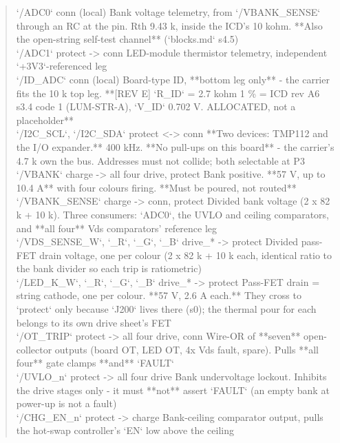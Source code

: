 \documentclass[11pt,a4paper]{article}
\begin{document}
\begin{quote}
\textbar{} `/ADC0` \textbar{} conn (local) \textbar{} Bank voltage telemetry, from `/VBANK\_SENSE` through an RC at the pin. Rth 9.43 k, inside the ICD's 10 kohm. {*}{*}Also the open-string self-test channel{*}{*} (`blocks.md` s4.5) \textbar{}\\
\textbar{} `/ADC1` \textbar{} protect -\textgreater{} conn \textbar{} LED-module thermistor telemetry, independent `+3V3`-referenced leg \textbar{}\\
\textbar{} `/ID\_ADC` \textbar{} conn (local) \textbar{} Board-type ID, {*}{*}bottom leg only{*}{*} - the carrier fits the 10 k top leg. {*}{*}{[}REV E{]} `R\_ID` = 2.7 kohm 1 \% = ICD rev A6 s3.4 code 1 (LUM-STR-A), `V\_ID` 0.702 V. ALLOCATED, not a placeholder{*}{*} \textbar{}\\
\textbar{} `/I2C\_SCL`, `/I2C\_SDA` \textbar{} protect \textless{}-\textgreater{} conn \textbar{} {*}{*}Two devices: TMP112 and the I/O expander.{*}{*} 400 kHz. {*}{*}No pull-ups on this board{*}{*} - the carrier's 4.7 k own the bus. Addresses must not collide; both selectable at P3 \textbar{}\\
\textbar{} `/VBANK` \textbar{} charge -\textgreater{} all four drive, protect \textbar{} Bank positive. {*}{*}57 V, up to 10.4 A{*}{*} with four colours firing. {*}{*}Must be poured, not routed{*}{*} \textbar{}\\
\textbar{} `/VBANK\_SENSE` \textbar{} charge -\textgreater{} conn, protect \textbar{} Divided bank voltage (2 x 82 k + 10 k). Three consumers: `ADC0`, the UVLO and ceiling comparators, and {*}{*}all four{*}{*} Vds comparators' reference leg \textbar{}\\
\textbar{} `/VDS\_SENSE\_W`, `\_R`, `\_G`, `\_B` \textbar{} drive\_{*} -\textgreater{} protect \textbar{} Divided pass-FET drain voltage, one per colour (2 x 82 k + 10 k each, identical ratio to the bank divider so each trip is ratiometric) \textbar{}\\
\textbar{} `/LED\_K\_W`, `\_R`, `\_G`, `\_B` \textbar{} drive\_{*} -\textgreater{} protect \textbar{} Pass-FET drain = string cathode, one per colour. {*}{*}57 V, 2.6 A each.{*}{*} They cross to `protect` only because `J200` lives there (s0); the thermal pour for each belongs to its own drive sheet's FET \textbar{}\\
\textbar{} `/OT\_TRIP` \textbar{} protect -\textgreater{} all four drive, conn \textbar{} Wire-OR of {*}{*}seven{*}{*} open-collector outputs (board OT, LED OT, 4x Vds fault, spare). Pulls {*}{*}all four{*}{*} gate clamps {*}{*}and{*}{*} `FAULT` \textbar{}\\
\textbar{} `/UVLO\_n` \textbar{} protect -\textgreater{} all four drive \textbar{} Bank undervoltage lockout. Inhibits the drive stages only - it must {*}{*}not{*}{*} assert `FAULT` (an empty bank at power-up is not a fault) \textbar{}\\
\textbar{} `/CHG\_EN\_n` \textbar{} protect -\textgreater{} charge \textbar{} Bank-ceiling comparator output, pulls the hot-swap controller's `EN` low above the ceiling \textbar{}
\end{quote}
\end{document}
